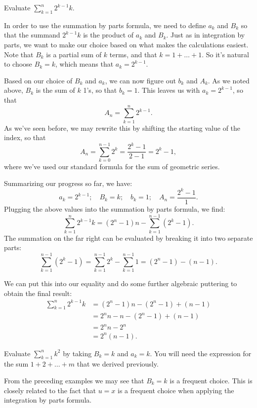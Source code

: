 \begin{example}{} Evaluate $\sum_{k=1}^{n}2^{k-1}k$.
 
In order to use the summation by parts formula, we need to define $a_k$ and $B_k$ so that the summand $2^{k-1}k$ is the product of $a_k$ and $B_k$. Just as in integration by parts, we want to make our choice based on what makes the calculations easiest. 
Note that $B_{k}$  is a partial sum of $k$ terms, and that $k = 1 + \ldots + 1$. So it's natural to choose $B_{k}=k$, which means that $a_{k}=2^{k-1}$.
 
Based on our choice of $B_{k}$ and  $a_{k}$, we can now figure out $b_{k}$ and $A_{k}$.  As we noted above, $B_{k}$ is the sum of $k$ 1's, so that $b_k=1$. This leaves us with $a_k = 2^{k-1}$, so that 
\[A_{n}=\sum_{k=1}^{n}2^{k-1}.\]
 As we've seen before, we may rewrite this by shifting the starting value of the index, so that 
\[A_{n}=\sum_{k=0}^{n-1}2^k =  \frac{2^k-1}{2-1} = 2^k-1,\]
where we've used our standard formula for the sum of geometric series.

Summarizing our progress so far, we have:
\[ a_k=2^{k-1};\quad B_k=k;\quad  b_k=1; \quad A_n=\frac{2^k-1}{1}. \]
Plugging the above values into the summation by parts formula, we find:
\[ \sum_{k=1}^{n}2^{k-1}k= \left (2 ^{n}-1 \right )n-\sum_{k=1}^{n-1}\left ( 2^{k}-1 \right ). \]
The summation on the far right can be evaluated by breaking it into two separate parts:
\[ \sum_{k=1}^{n-1}\left ( 2^{k}-1 \right )= \sum_{k=1}^{n-1}2^{k}-\sum_{k=1}^{n-1}1 = (2^{n}-1)- (n-1).\]
\end{example}
We can put this into our equality and do some further algebraic puttering to obtain the final result:
\begin{align*}
\sum_{k=1}^{n}2^{k-1}k &= (2 ^{n}-1)n- (2^{n}-1)+(n-1)\\
&=  2^{n}n-n-(2^{n}-1)+(n-1)\\
&=  2^{n}n-2^{n}\\
&=  2^{n}(n-1).
\end{align*}	

\begin{exercise}{}
Evaluate $\sum_{k=1}^{n}k^{2}$ by taking $B_k=k$ and $a_k = k$. You will need the expression for the sum $1 + 2 + \ldots + m$ that we derived previously.
\end{exercise}

From the preceding examples we may see that $B_k = k$ is a frequent choice. This is closely related to the fact that $u=x$ is a frequent choice when applying  the integration by parts formula.


